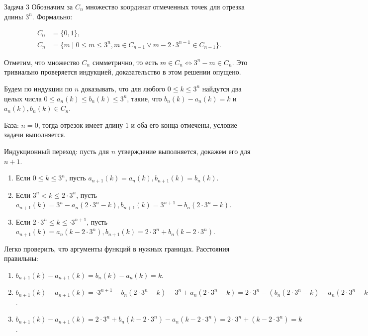 \documentclass{article}
\begin{document}
	\begin{section}{Задача 3}
		Обозначим за $C_n$ множество координат отмеченных точек для отрезка длины $3^n$. Формально:

		\begin{align*}
			C_0 &= \{0, 1\},\\
			C_n &= \{m \mid 0 \le m \le 3^n, m \in C_{n-1} \lor m - 2 \cdot 3^{n-1} \in C_{n-1} \}.
		\end{align*}

		Отметим, что множество $C_n$ симметрично, то есть $m \in C_n \iff 3^n - m \in C_n$. Это тривиально проверяется индукцией, доказательство в этом решении опущено.

		Будем по индукции по $n$ доказывать, что для любого $0 \le k \le 3^n$ найдутся два целых числа $0 \le a_n(k) \le b_n(k) \le 3^n$, такие, что $b_n(k) - a_n(k) = k$ и $a_n(k), b_n(k) \in C_n$.

		База: $n = 0$, тогда отрезок имеет длину $1$ и оба его конца отмечены, условие задачи выполняется.

		Индукционный переход: пусть для $n$ утверждение выполняется, докажем его для $n + 1$.

		\begin{enumerate}
			\item Если $0 \le k \le 3^n$, пусть $a_{n+1}(k) = a_n(k), b_{n+1}(k) = b_n(k)$.

			\item Если $3^n < k \le 2 \cdot 3^n$, пусть $a_{n+1}(k) = 3^n - a_n(2 \cdot 3^n - k), b_{n+1}(k) = 3^{n+1} - b_n(2 \cdot 3^n - k)$.

			\item Если $2 \cdot 3^n \le k \le \cdot 3^{n+1}$, пусть $a_{n+1}(k) = a_n(k - 2 \cdot 3^n), b_{n+1}(k) = 2 \cdot 3^n + b_n(k - 2 \cdot 3^n)$.
		\end{enumerate}

		Легко проверить, что аргументы функций в нужных границах. Расстояния правильны:

		\begin{enumerate}
			\item $b_{n+1}(k) - a_{n+1}(k) = b_n(k) - a_n(k) = k$.

			\item $b_{n+1}(k) - a_{n+1}(k) = \cdot 3^{n+1} - b_n(2 \cdot 3^n - k) - 3^n + a_n(2 \cdot 3^n - k) = 2 \cdot 3^n - (b_n(2 \cdot 3^n - k) - a_n(2 \cdot 3^n - k)) = 2 \cdot 3^n - (2 \cdot 3^n - k) = k$.

			\item $b_{n+1}(k) - a_{n+1}(k) = 2 \cdot 3^n + b_n(k - 2 \cdot 3^n) - a_n(k - 2 \cdot 3^n) = 2 \cdot 3^n + (k - 2 \cdot 3^n) = k$.
		\end{enumerate}


\end{section}
\end{document}
